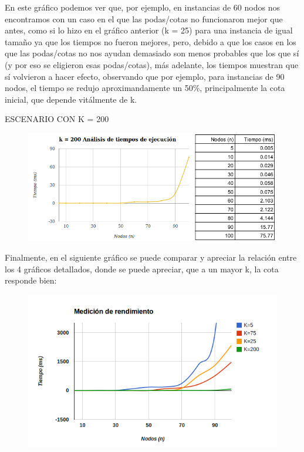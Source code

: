 \documentclass[10pt,a4paper]{article}
\begin{document}
En este gráfico podemos ver que, por ejemplo, en instancias de 60 nodos nos encontramos con un caso en el que las podas/cotas no funcionaron mejor que antes, como si lo hizo en el gráfico anterior (k = 25) para una instancia de igual tamaño ya que los tiempos no fueron mejores, pero, debido a que los casos en los que las podas/cotas no nos ayudan demasiado son menos probables que los que sí (y por eso se eligieron esas podas/cotas), más adelante, los tiempos muestran que sí volvieron a hacer efecto, observando que por ejemplo, para instancias de 90 nodos, el tiempo se redujo aproximandamente un 50\%, principalmente la cota inicial, que depende vitálmente de k.

\newpage \indent ESCENARIO CON K = 200
	\begin{figure}[h]
		\begin{center}
		   \includegraphics[scale=0.80]{paraGraficar/k200.png}
		\end{center}
	\end{figure}


Finalmente, en el siguiente gráfico se puede comparar y apreciar la relación entre los 4 gráficos detallados, donde se puede apreciar, que a un mayor k, la cota responde bien:

	\begin{figure}[h]
		\begin{center}
		   \includegraphics[scale=0.80]{paraGraficar/todasK.png}
		\end{center}
	\end{figure}
	
\end{document}
